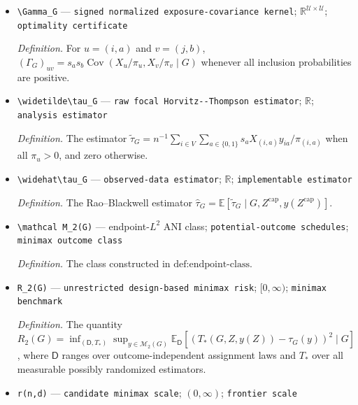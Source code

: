 \documentclass{article}
\begin{document}
\begin{itemize}
  \par\smallskip\noindent\emph{Definition.} The probability \(\pi_u=\mathbb E_{\mathsf D_G^{\mathrm{cap}}}[X_u\mid G]\).
  \item \texttt{\textbackslash{}\allowbreak{}Gamma\_\allowbreak{}G} --- \texttt{signed normalized exposure-\allowbreak{}covariance kernel}; \(\mathbb R^{\mathcal U\times\mathcal U}\); \texttt{optimality certificate}
  \par\smallskip\noindent\emph{Definition.} For \(u=(i,a)\) and \(v=(j,b)\), \((\Gamma_G)_{uv}=s_as_b\operatorname{Cov}(X_u/\pi_u,X_v/\pi_v\mid G)\) whenever all inclusion probabilities are positive.
  \item \texttt{\textbackslash{}\allowbreak{}widetilde\textbackslash{}\allowbreak{}tau\_\allowbreak{}G} --- \texttt{raw focal Horvitz-\allowbreak{}-\allowbreak{}Thompson estimator}; \(\mathbb R\); \texttt{analysis estimator}
  \par\smallskip\noindent\emph{Definition.} The estimator \(\widetilde\tau_G=n^{-1}\sum_{i\in V}\sum_{a\in\{0,1\}}s_aX_{(i,a)}y_{ia}/\pi_{(i,a)}\) when all \(\pi_u>0\), and zero otherwise.
  \item \texttt{\textbackslash{}\allowbreak{}widehat\textbackslash{}\allowbreak{}tau\_\allowbreak{}G} --- \texttt{observed-\allowbreak{}data estimator}; \(\mathbb R\); \texttt{implementable estimator}
  \par\smallskip\noindent\emph{Definition.} The Rao--Blackwell estimator \(\widehat\tau_G=\mathbb E[\widetilde\tau_G\mid G,Z^{\mathrm{cap}},y(Z^{\mathrm{cap}})]\).
  \item \texttt{\textbackslash{}\allowbreak{}mathcal M\_\allowbreak{}2(G)} --- endpoint-\(L^2\) ANI class; \texttt{potential-\allowbreak{}outcome schedules}; \texttt{minimax outcome class}
  \par\smallskip\noindent\emph{Definition.} The class constructed in \(\text{def:endpoint-class}\).
  \item \texttt{R\_\allowbreak{}2(G)} --- \texttt{unrestricted design-\allowbreak{}based minimax risk}; \([0,\infty)\); \texttt{minimax benchmark}
  \par\smallskip\noindent\emph{Definition.} The quantity \(R_2(G)=\inf_{(\mathsf D,T_*)}\sup_{y\in\mathcal M_2(G)}\mathbb E_{\mathsf D}[(T_*(G,Z,y(Z))-\tau_G(y))^2\mid G]\), where \(\mathsf D\) ranges over outcome-independent assignment laws and \(T_*\) over all measurable possibly randomized estimators.
  \item \texttt{r(n,\allowbreak{}d)} --- \texttt{candidate minimax scale}; \((0,\infty)\); \texttt{frontier scale}

\end{itemize}
\end{document}
